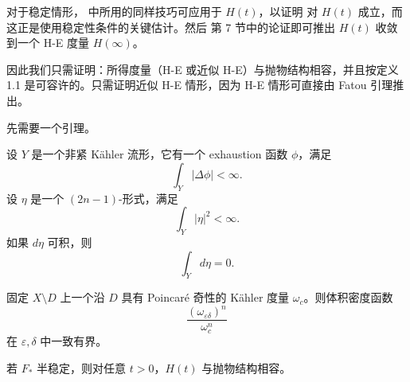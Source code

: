 对于稳定情形，\cite[Proposition 4.1]{Li-Zh-Zh} 中所用的同样技巧可应用于 \(H(t)\)，以证明 \cite[Proposition 5.3]{Si1} 对 \(H(t)\) 成立，而这正是使用稳定性条件的关键估计。然后 \cite{Si1} 第 7 节中的论证即可推出 \(H(t)\) 收敛到一个 H-E 度量 \(H(\infty)\)。

因此我们只需证明：所得度量（H-E 或近似 H-E）与抛物结构相容，并且按定义 1.1 是可容许的。只需证明近似 H-E 情形，因为 H-E 情形可直接由 Fatou 引理推出。

先需要一个引理。

\begin{lemma}[{\cite[Lemma 5.2]{Si1}}]
设 \(Y\) 是一个非紧 Kähler 流形，它有一个 exhaustion 函数 \(\phi\)，满足
\[
\int_Y |\Delta \phi|<\infty.
\]
设 \(\eta\) 是一个 \((2n-1)\)-形式，满足
\[
\int_Y |\eta|^2<\infty.
\]
如果 \(d\eta\) 可积，则
\[
\int_Y d\eta=0.
\]
\end{lemma}

固定 \(X\setminus D\) 上一个沿 \(D\) 具有 Poincar\'e 奇性的 Kähler 度量 \(\omega_c\)。则体积密度函数
\[
\frac{(\omega_{\varepsilon\delta})^n}{\omega_c^n}
\]
在 \(\varepsilon,\delta\) 中一致有界。

\begin{proposition}
若 \(F_*\) 半稳定，则对任意 \(t>0\)，\(H(t)\) 与抛物结构相容。
\end{proposition}

